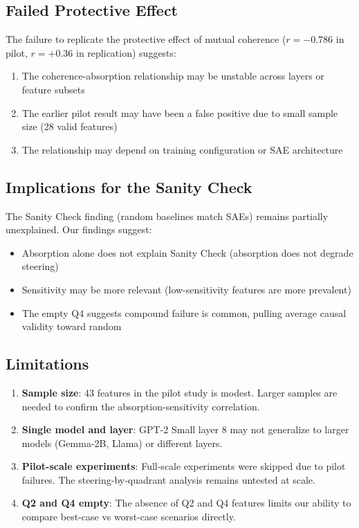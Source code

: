 \documentclass{article}
\begin{document}
\subsection{Failed Protective Effect}

The failure to replicate the protective effect of mutual coherence ($r = -0.786$ in pilot, $r = +0.36$ in replication) suggests:
\begin{enumerate}
  \item The coherence-absorption relationship may be unstable across layers or feature subsets
  \item The earlier pilot result may have been a false positive due to small sample size (28 valid features)
  \item The relationship may depend on training configuration or SAE architecture
\end{enumerate}

\subsection{Implications for the Sanity Check}

The Sanity Check finding (random baselines match SAEs) remains partially unexplained. Our findings suggest:
\begin{itemize}
  \item Absorption alone does not explain Sanity Check (absorption does not degrade steering)
  \item Sensitivity may be more relevant (low-sensitivity features are more prevalent)
  \item The empty Q4 suggests compound failure is common, pulling average causal validity toward random
\end{itemize}

\subsection{Limitations}

\begin{enumerate}
  \item \textbf{Sample size}: 43 features in the pilot study is modest. Larger samples are needed to confirm the absorption-sensitivity correlation.
  \item \textbf{Single model and layer}: GPT-2 Small layer 8 may not generalize to larger models (Gemma-2B, Llama) or different layers.
  \item \textbf{Pilot-scale experiments}: Full-scale experiments were skipped due to pilot failures. The steering-by-quadrant analysis remains untested at scale.
  \item \textbf{Q2 and Q4 empty}: The absence of Q2 and Q4 features limits our ability to compare best-case vs worst-case scenarios directly.
\end{enumerate}
\end{document}
